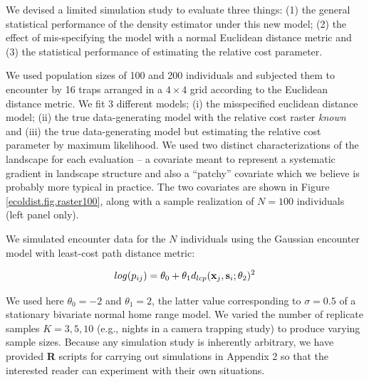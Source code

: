 \documentclass[12pt]{article}
\begin{document}
We devised a limited simulation study to evaluate three things: (1)
the general statistical performance of the density estimator under
this new model; (2) the effect of mis-specifying the model with a
normal Euclidean distance metric and (3) the statistical performance
of estimating the relative cost parameter.

We used population sizes of 100 and 200 individuals and subjected them
to encounter by 16 traps arranged in a $4\times 4$ grid according to
the Euclidean distance metric. We fit 3 different models; (i) the
misspecified euclidean distance model; (ii) the true data-generating
model with the relative cost raster {\it known} and (iii) the true
data-generating model but estimating the relative cost parameter by
maximum likelihood.  We used two distinct characterizations of the
landscape for each evaluation -- a covariate meant to represent a
systematic gradient in landscape structure and also a ``patchy''
covariate which we believe is probably more typical in practice. The
two covariates are shown in Figure \ref{ecoldist.fig.raster100}, along
with a sample realization of $N=100$ individuals (left panel only).

We simulated encounter data for the $N$ individuals using the Gaussian
encounter model with least-cost path distance metric:

\[
log(p_{ij})= \theta_{0} + \theta_{1} d_{lcp}({\bf x}_{j},{\bf
  s}_{i}; \theta_{2})^{2}
\]

{\flushleft We } used here $\theta_{0} = -2$ and $\theta_{1} = 2$, the latter value
corresponding to $\sigma = 0.5$ of a stationary bivariate normal home
range model.  We varied the number of replicate samples $K=3,5,10$
(e.g., nights in a camera trapping study) to produce varying sample
sizes.  Because any simulation study is inherently arbitrary, we have
provided {\bf R} scripts for carrying out simulations in Appendix 2 so
that the interested reader can experiment with their own situations.
\end{document}

